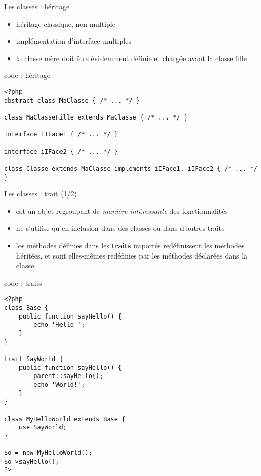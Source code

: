 \begin{frame}[containsverbatim]{Les classes : héritage}
	\begin{itemize}
		\item héritage classique, non multiple
		\item implémentation d'interface multiples
		\item la classe mère doit être évidemment définie et chargée avant la classe fille
	\end{itemize}
	\begin{block}{code : héritage}
		\begin{lstlisting}
<?php
abstract class MaClasse { /* ... */ }

class MaClasseFille extends MaClasse { /* ... */ }

interface iIFace1 { /* ... */ }

interface iIFace2 { /* ... */ }

class Classe extends MaClasse implements iIFace1, iIFace2 { /* ... */ } 
		\end{lstlisting}
	\end{block}
\end{frame}


\begin{frame}[containsverbatim]{Les classes : trait (1/2)}
	\begin{itemize}
		\item est un objet regroupant de \textit{manière intéressante} des fonctionnalités
		\item ne s'utilise qu'en inclusion dans des classes ou dans d'autres traits
		\item les méthodes définies dans les \textbf{traits} importés redéfinissent les méthodes héritées, et sont elles-mêmes redéfinies par les méthodes déclarées dans la classe
	\end{itemize}
	\begin{block}{code : traits}
		\begin{lstlisting}
<?php
class Base {
    public function sayHello() {
        echo 'Hello ';
    }
}

trait SayWorld {
    public function sayHello() {
        parent::sayHello();
        echo 'World!';
    }
}

class MyHelloWorld extends Base {
    use SayWorld;
}

$o = new MyHelloWorld();
$o->sayHello();
?>
		\end{lstlisting}
	\end{block}
\end{frame}

